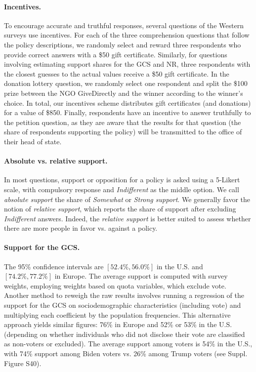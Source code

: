 \documentclass[12pt,english]{article}
\begin{document}
\begin{small}
\paragraph{\small Incentives.} %
To encourage accurate and truthful responses, several questions of the Western surveys use incentives. For each of the three comprehension questions that follow the policy descriptions, we randomly select and reward three respondents who provide correct answers with a \$50 gift certificate. Similarly, for questions involving estimating support shares for the GCS and NR, three respondents with the closest guesses to the actual values receive a \$50 gift certificate. In the donation lottery question, we randomly select one respondent and split the \$100 prize between the NGO GiveDirectly and the winner according to the winner's choice. In total, our incentives scheme distributes gift certificates (and donations) for a value of \$850. Finally, respondents have an incentive to answer truthfully to the petition question, as they are aware that the results for that question (the share of respondents supporting the policy) will be transmitted to the office of their head of state.
\paragraph{\small Absolute vs. relative support.}
In most questions, support or opposition for a policy is asked using a 5-Likert scale, with compulsory response and \textit{Indifferent} as the middle option. We call \textit{absolute support} the share of \textit{Somewhat} or \textit{Strong support}. We generally favor the notion of \textit{relative support}, which reports the share of support after excluding \textit{Indifferent} answers. Indeed, the \textit{relative support} is better suited to assess whether there are more people in favor vs. against a policy.

\paragraph{\small Support for the GCS.} 
The 95\% confidence intervals are $[52.4\%, 56.0\%]$ in the U.S. and $[74.2\%, 77.2\%]$ in Europe. The average support is computed with survey weights, employing weights based on quota variables, which exclude vote. Another method to reweigh the raw results involves running a regression of the support for the GCS on sociodemographic characteristics (including vote) and multiplying each coefficient by the population frequencies. This alternative approach yields similar figures: 76\% in Europe and 52\% or 53\% in the U.S. (depending on whether individuals who did not disclose their vote are classified as non-voters or excluded). The average support among voters is 54\% in the U.S., with 74\% support among Biden voters vs. 26\% among Trump voters (see Suppl. Figure S40). %


\end{small}
\end{document}
